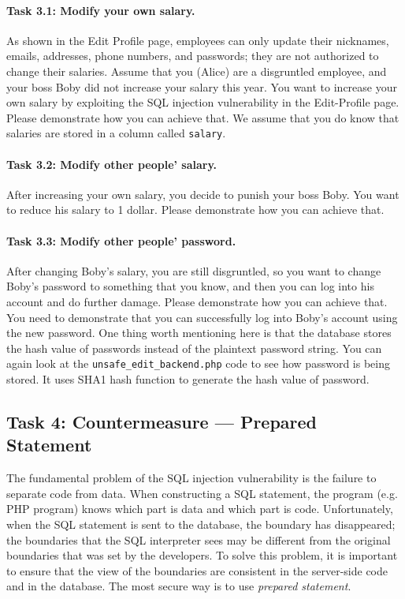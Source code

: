 \paragraph{Task 3.1: Modify your own salary.}  
As shown in the Edit Profile page,
employees can only update their nicknames, emails, addresses, phone numbers, and
passwords; they are not authorized to change their salaries.  
Assume that you (Alice) are a disgruntled employee, and your boss Boby did not 
increase your salary this year. You want to increase your own salary 
by exploiting the SQL injection vulnerability in
the Edit-Profile page. Please demonstrate how you can achieve that.
We assume that you do know that salaries are stored in 
a column called \texttt{salary}.


\paragraph{Task 3.2: Modify other people' salary.}
After increasing your own salary, you decide to punish your boss Boby. You want to reduce his
salary to 1 dollar. Please demonstrate how you can achieve that. 



\paragraph{Task 3.3: Modify other people' password.}
After changing Boby's salary, you are still disgruntled, so you
want to change Boby's password to something that you know, and then you can log into his account
and do further damage. Please demonstrate how you can achieve that.
You need to demonstrate that you can 
successfully log into Boby's account using the new
password.  One thing worth mentioning here is that the database stores the hash value of
passwords instead of the plaintext password string. You can again look at
the {\tt unsafe\_edit\_backend.php} code to see how password is being stored. It
uses SHA1 hash function to generate the hash value of password. 




\subsection{Task 4: Countermeasure --- Prepared Statement} 

The fundamental problem of the SQL injection vulnerability is the failure to
separate code from data. When constructing a SQL statement, the program
(e.g. PHP program) knows which part is data and which part is code.
Unfortunately, when the SQL statement is sent to the database, the boundary
has disappeared; the boundaries that the SQL interpreter sees may be
different from the original boundaries that was set by the developers.
To solve this problem, it is important to ensure that the view
of the boundaries are consistent in the server-side code and in the
database.  The most secure way is to use 
\textit{prepared statement}. 


